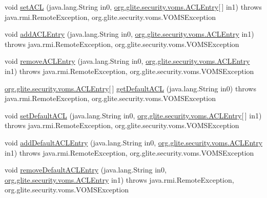 \begin{DoxyCompactItemize}
\item 
void \hyperlink{classorg_1_1glite_1_1security_1_1voms_1_1service_1_1admin_1_1VOMSAdminSoapBindingStub_a199347637b56ec4c3a1bf8f0921e9669}{setACL} (java.lang.String in0, \hyperlink{classorg_1_1glite_1_1security_1_1voms_1_1ACLEntry}{org.glite.security.voms.ACLEntry}\mbox{[}$\,$\mbox{]} in1)  throws java.rmi.RemoteException, org.glite.security.voms.VOMSException 
\item 
void \hyperlink{classorg_1_1glite_1_1security_1_1voms_1_1service_1_1admin_1_1VOMSAdminSoapBindingStub_a83a72d584bec86c01a88cd86e4128e43}{addACLEntry} (java.lang.String in0, \hyperlink{classorg_1_1glite_1_1security_1_1voms_1_1ACLEntry}{org.glite.security.voms.ACLEntry} in1)  throws java.rmi.RemoteException, org.glite.security.voms.VOMSException 
\item 
void \hyperlink{classorg_1_1glite_1_1security_1_1voms_1_1service_1_1admin_1_1VOMSAdminSoapBindingStub_adb006760079dca396aca41278068c65e}{removeACLEntry} (java.lang.String in0, \hyperlink{classorg_1_1glite_1_1security_1_1voms_1_1ACLEntry}{org.glite.security.voms.ACLEntry} in1)  throws java.rmi.RemoteException, org.glite.security.voms.VOMSException 
\item 
\hyperlink{classorg_1_1glite_1_1security_1_1voms_1_1ACLEntry}{org.glite.security.voms.ACLEntry}\mbox{[}$\,$\mbox{]} \hyperlink{classorg_1_1glite_1_1security_1_1voms_1_1service_1_1admin_1_1VOMSAdminSoapBindingStub_a9cc0a6d22cde72c5e3c20bc7696dee91}{getDefaultACL} (java.lang.String in0)  throws java.rmi.RemoteException, org.glite.security.voms.VOMSException 
\item 
void \hyperlink{classorg_1_1glite_1_1security_1_1voms_1_1service_1_1admin_1_1VOMSAdminSoapBindingStub_a01fec703feebf33010dd650cc8796c69}{setDefaultACL} (java.lang.String in0, \hyperlink{classorg_1_1glite_1_1security_1_1voms_1_1ACLEntry}{org.glite.security.voms.ACLEntry}\mbox{[}$\,$\mbox{]} in1)  throws java.rmi.RemoteException, org.glite.security.voms.VOMSException 
\item 
void \hyperlink{classorg_1_1glite_1_1security_1_1voms_1_1service_1_1admin_1_1VOMSAdminSoapBindingStub_aa231a731641262e01f672ebe2cdd7dd2}{addDefaultACLEntry} (java.lang.String in0, \hyperlink{classorg_1_1glite_1_1security_1_1voms_1_1ACLEntry}{org.glite.security.voms.ACLEntry} in1)  throws java.rmi.RemoteException, org.glite.security.voms.VOMSException 
\item 
void \hyperlink{classorg_1_1glite_1_1security_1_1voms_1_1service_1_1admin_1_1VOMSAdminSoapBindingStub_a0d9c7040c30975cbb4ed89b6b23a482c}{removeDefaultACLEntry} (java.lang.String in0, \hyperlink{classorg_1_1glite_1_1security_1_1voms_1_1ACLEntry}{org.glite.security.voms.ACLEntry} in1)  throws java.rmi.RemoteException, org.glite.security.voms.VOMSException 

\end{DoxyCompactItemize}
